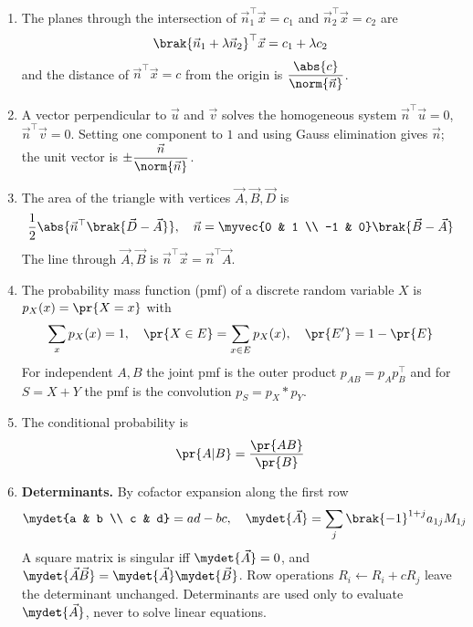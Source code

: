 \begin{enumerate}[label=\thesubsection.\arabic*, ref=\thesubsection.\theenumi,itemsep=0pt]
\item The planes through the intersection of $\vec{n}_1^{\top}\vec{x} = c_1$ and $\vec{n}_2^{\top}\vec{x} = c_2$ are
\begin{align}
\brak{\vec{n}_1 + \lambda\vec{n}_2}^{\top}\vec{x} = c_1 + \lambda c_2
\label{eq:cb12-family}
\end{align}
and the distance of $\vec{n}^{\top}\vec{x} = c$ from the origin is $\dfrac{\abs{c}}{\norm{\vec{n}}}$.

\item A vector perpendicular to $\vec{u}$ and $\vec{v}$ solves the homogeneous system $\vec{n}^{\top}\vec{u} = 0$, $\vec{n}^{\top}\vec{v} = 0$. Setting one component to $1$ and using Gauss elimination gives $\vec{n}$; the unit vector is $\pm\dfrac{\vec{n}}{\norm{\vec{n}}}$.
\label{eq:cb12-perp}

\item The area of the triangle with vertices $\vec{A}, \vec{B}, \vec{D}$ is
\begin{align}
\frac{1}{2}\abs{\vec{n}^{\top}\brak{\vec{D}-\vec{A}}}, \quad \vec{n} = \myvec{0 & 1 \\ -1 & 0}\brak{\vec{B}-\vec{A}}
\label{eq:cb12-area}
\end{align}
The line through $\vec{A}, \vec{B}$ is $\vec{n}^{\top}\vec{x} = \vec{n}^{\top}\vec{A}$.

\item The probability mass function (pmf) of a discrete random variable $X$ is $p_X(x) = \pr{X=x}$ with
\begin{align}
\sum_x p_X(x) = 1, \quad \pr{X \in E} = \sum_{x\in E}p_X(x), \quad \pr{E'} = 1 - \pr{E}
\label{eq:cb12-pmf}
\end{align}
For independent $A, B$ the joint pmf is the outer product $p_{AB} = p_A p_B^{\top}$ and for $S = X+Y$ the pmf is the convolution $p_S = p_X * p_Y$.

\item The conditional probability is
\begin{align}
\pr{A|B} = \frac{\pr{AB}}{\pr{B}}
\label{eq:cb12-cond}
\end{align}

\item \textbf{Determinants.} By cofactor expansion along the first row
\begin{align}
\mydet{a & b \\ c & d} = ad - bc, \quad \mydet{\vec{A}} = \sum_{j}\brak{-1}^{1+j}a_{1j}M_{1j}
\label{eq:cb12-det}
\end{align}
A square matrix is singular iff $\mydet{\vec{A}} = 0$, and $\mydet{\vec{A}\vec{B}} = \mydet{\vec{A}}\mydet{\vec{B}}$. Row operations $R_i \leftarrow R_i + cR_j$ leave the determinant unchanged. Determinants are used only to evaluate $\mydet{\vec{A}}$, never to solve linear equations.


\end{enumerate}
